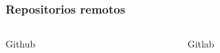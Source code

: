 \documentclass{beamer}
\begin{document}
\begin{frame}\frametitle{Repositorios remotos}
	\begin{columns}
		\begin{column}{0.5\textwidth}
			\begin{block}{Github}
				
			\end{block}
		\end{column}
		\begin{column}{0.5\textwidth}
			\begin{block}{Gitlab}
				
			\end{block}
		\end{column}
	\end{columns}
\end{frame}
\end{document}
